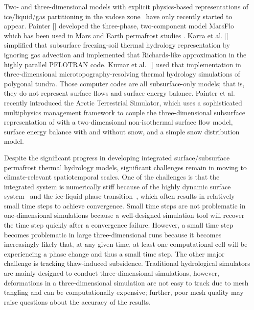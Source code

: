 \documentclass[review]{elsarticle}
\begin{document}
Two- and three-dimensional models with explicit physics-based representations of ice/liquid/gas partitioning in the vadose zone~\cite{painter2014constitutive} have only recently started to appear. Painter [\citeyear{marsflo}] developed the three-phase, two-component model MarsFlo which has been used in Mars \cite{grimm2009mars} and Earth permafrost studies \cite{frampton2011}.  Karra et al. [\citeyear{karra2014three}] simplified that subsurface freezing-soil thermal hydrology representation by ignoring gas advection and implemented that Richards-like approximation in the highly parallel PFLOTRAN \cite{pflotran-web-page} code. Kumar et al.~[\citeyear{kumar2016modeling}] used that implementation in three-dimensional microtopography-resolving thermal hydrology simulations of polygonal tundra. Those computer codes are all subsurface-only models; that is, they do not represent surface flows and surface energy balance. Painter et al. \citeyear{spainter2016integrated} recently introduced the Arctic Terrestrial Simulator, which uses a sophisticated multiphysics management framework \cite{ecoon2016managing} to couple the three-dimensional subsurface representation of \cite{karra2014three} with a two-dimensional non-isothermal surface flow model, surface energy balance with and without snow, and a simple snow distribution model. 

Despite the significant progress in developing integrated surface/subsurface permafrost thermal hydrology models, significant challenges remain in moving to climate-relevant spatiotemporal scales. One of the challenges is that the integrated system is numerically stiff because of the highly dynamic surface system~\cite{spainter2016integrated} and the ice-liquid phase transition~\cite{dall2011robust}, which often results in relatively small time steps to achieve convergence. Small time steps are not problematic in one-dimensional simulations because a well-designed simulation tool will recover the time step quickly after a convergence failure. However, a small time step becomes problematic in large three-dimensional runs because it becomes increasingly likely that, at any given time, at least one computational cell will be experiencing a phase change and thus a small time step. The other major challenge is tracking thaw-induced subsidence. Traditional hydrological simulators are mainly designed to conduct three-dimensional simulations, however, deformations in a three-dimensional simulation are not easy to track due to mesh tangling and can be computationally expensive; further, poor mesh quality may raise questions about the accuracy of the results. 
\end{document}
